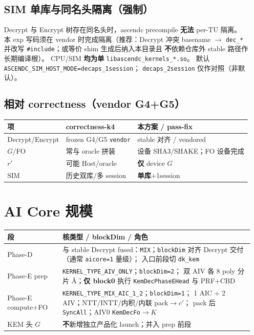 \documentclass[UTF8,a4paper,11pt]{ctexart}
\begin{document}
\subsection{SIM 单库与同名头隔离（强制）}

Decrypt 与 Encrypt 树存在同名头时，ascendc precompile \textbf{无法} per-TU 隔离。
本 exp 写码须在 vendor 时完成隔离（推荐：Decrypt 冲突 basename $\to$
\texttt{dec\_*} 并改写 \texttt{\#include}；或等价 shim 生成后纳入本目录且
\textbf{不}依赖仓库外 stable 路径作长期编译根）。
CPU/SIM \textbf{均为单} \texttt{libascendc\_kernels\_*.so}。
默认 \texttt{ASCENDC\_SIM\_HOST\_MODE=decaps\_1session}；
\texttt{decaps\_2session} 仅作对照（非默认）。

\subsection{相对 correctness（vendor G4+G5）}

\begin{longtable}{@{}L{3.2cm}L{4.8cm}L{4.8cm}@{}}
\toprule
项 & correctness-k4 & \textbf{本方案 / pass-fix} \\
\midrule
Decrypt/Encrypt & frozen G4/G5 \texttt{vendor} & stable 对齐 / vendored \\
$G$/FO & 常与 oracle 拼装 & 设备 SHA3/SHAKE；FO 设备完成 \\
$r'$ & 可能 Host/oracle & \textbf{仅} device $G$ \\
SIM & 历史双库/多 session & \textbf{单库}+1session \\
\bottomrule
\end{longtable}

\section{AI Core 规模}
\label{sec:aicore}

\begin{longtable}{@{}L{3.2cm}L{10cm}@{}}
\toprule
段 & 核类型 / blockDim / 角色 \\
\midrule
Phase-D & 与 stable Decrypt fused：\texttt{MIX}；\texttt{blockDim}
          对齐 Decrypt 交付（通常 \texttt{aicore=1} 量级）；
          入口前段切 \texttt{dk\_kem} \\
Phase-E prep & \texttt{KERNEL\_TYPE\_AIV\_ONLY}；\texttt{blockDim=2}；
             双 AIV 各 8 poly 分片 \^A；\textbf{仅 block0} 执行
             \texttt{KemDecPhaseEHead} 与 PRF+CBD \\
Phase-E compute+FO & \texttt{KERNEL\_TYPE\_MIX\_AIC\_1\_2}；\texttt{blockDim=1}；
                1 AIC + 2 AIV；NTT/INTT/内积/内联 pack$\to c'$；
                pack 后 \texttt{SyncAll}；AIV0 \texttt{KemDecFo}$\to K$ \\
KEM 头 $G$ & \textbf{不}新增独立产品化 launch；并入 prep 前段 \\
\bottomrule
\end{longtable}
\end{document}
